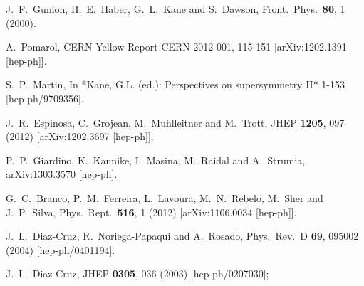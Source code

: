 \documentclass[aps,prd,groupaddress,floatfix,tighten,nofootinbib,showpacs,
amsfonts,superscriptaddress]{revtex4}
\begin{document}
{\begin{thebibliography}{99}
  J.~F.~Gunion, H.~E.~Haber, G.~L.~Kane and S.~Dawson,
  Front.\ Phys.\  {\bf 80}, 1 (2000).

  A.~Pomarol,
  CERN Yellow Report CERN-2012-001, 115-151
  [arXiv:1202.1391 [hep-ph]].


  S.~P.~Martin,
  In *Kane, G.L. (ed.): Perspectives on supersymmetry II* 1-153
  [hep-ph/9709356].
  
  

  J.~R.~Espinosa, C.~Grojean, M.~Muhlleitner and M.~Trott,
  JHEP {\bf 1205}, 097 (2012)
  [arXiv:1202.3697 [hep-ph]].
  
  P.~P.~Giardino, K.~Kannike, I.~Masina, M.~Raidal and A.~Strumia,
  arXiv:1303.3570 [hep-ph].
  
  
  G.~C.~Branco, P.~M.~Ferreira, L.~Lavoura, M.~N.~Rebelo, M.~Sher and J.~P.~Silva,
  Phys.\ Rept.\  {\bf 516}, 1 (2012)
  [arXiv:1106.0034 [hep-ph]].


  
   J.~L.~Diaz-Cruz, R.~Noriega-Papaqui and A.~Rosado,
  Phys.\ Rev.\ D {\bf 69}, 095002 (2004)
  [hep-ph/0401194].
  
  
  J.~L.~Diaz-Cruz,
  JHEP {\bf 0305}, 036 (2003)
  [hep-ph/0207030];
  

\end{thebibliography}}
\end{document}
